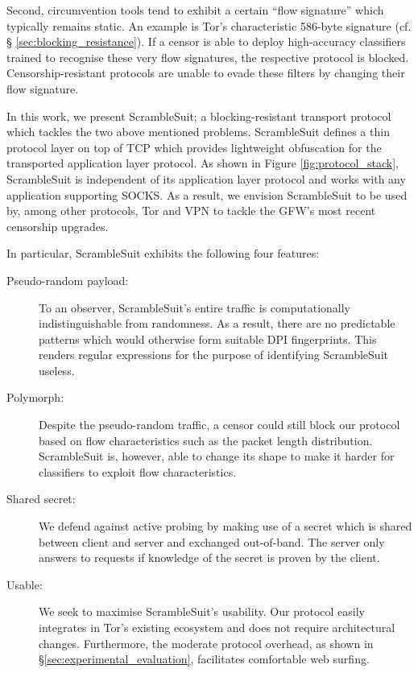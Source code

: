 \documentclass{sig-alternate}
\newcommand{\pt}{\textsf{ScrambleSuit}}
\numberwithin{enumi}{section}
\numberwithin{notesctr}{section}
\begin{document}
Second, circumvention tools tend to exhibit a certain ``flow signature'' which typically remains
static. An example is Tor's characteristic 586-byte signature (cf. \S
\ref{sec:blocking_resistance}).
If a censor is able to deploy high-accuracy classifiers trained to recognise these very
flow signatures, the respective protocol is blocked. Censorship-resistant protocols are unable to
evade these filters by changing their flow signature.



In this work, we present \pt{}; a blocking-resistant transport protocol which tackles the two above
mentioned problems. \pt{} defines a thin protocol layer on top of TCP which provides lightweight
obfuscation for the transported application layer protocol. As shown in Figure
\ref{fig:protocol_stack}, \pt{} is independent of its application layer protocol and works with any
application supporting SOCKS. As a result, we envision \pt{} to be used by, among other protocols,
Tor and VPN to tackle the GFW's most recent censorship upgrades.

In particular, \pt{} exhibits the following four features:
\begin{description}
	\item[Pseudo-random payload:] To an observer, \pt{}'s entire traffic is computationally
		indistinguishable from randomness. As a result, there are no predictable patterns which
		would otherwise form suitable DPI fingerprints. This renders regular expressions for the
		purpose of identifying \pt{} useless.
	\item[Polymorph:] Despite the pseudo-random traffic, a censor could still block our protocol
		based on flow characteristics such as the packet length distribution. \pt{} is, however,
		able to change its shape to make it harder for classifiers to exploit flow characteristics.
	\item[Shared secret:] We defend against active probing by making use of a secret which is shared
		between client and server and exchanged out-of-band. The server only answers to requests if
		knowledge of the secret is proven by the client.
\item[Usable:] We seek to maximise \pt{}'s usability. Our protocol easily integrates in Tor's
		existing ecosystem and does not require architectural changes. Furthermore, the moderate
		protocol overhead, as shown in \S \ref{sec:experimental_evaluation}, facilitates
		comfortable web surfing.
\end{description}
\end{document}
